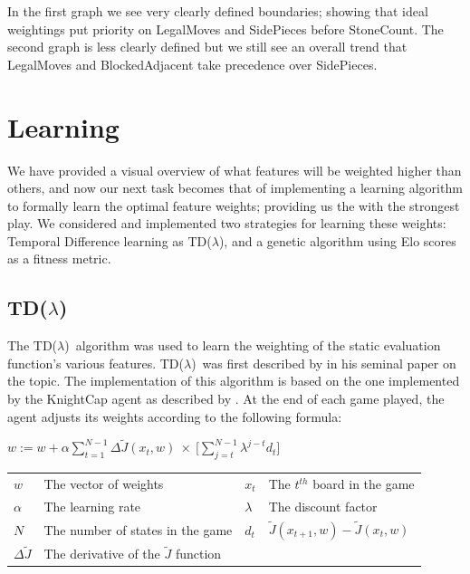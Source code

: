\documentclass[11pt]{article}
\newcommand{\tdl}{TD($\lambda$)}
\begin{document}
In the first graph we see very clearly defined boundaries; showing that ideal weightings
put priority on LegalMoves and SidePieces before StoneCount. The second graph is less
clearly defined but we still see an overall trend that LegalMoves and BlockedAdjacent
take precedence over SidePieces.

\section{Learning}
\label{sec:learning}

We have provided a visual overview of what features will be weighted higher
than others, and now our next task becomes that of implementing a learning algorithm
to formally learn the optimal feature weights; providing us the with
the strongest play. We considered and implemented two strategies for learning
these weights: Temporal Difference learning as \tdl, and a genetic algorithm
using Elo scores as a fitness metric.

\subsection{\tdl}
\label{sub:tdlambda}

The \tdl\ algorithm was used to learn the weighting of the static evaluation
function's various features. \tdl\ was first described by \citet{Sutton1988}
in his seminal paper on the topic. The implementation of this algorithm is
based on the one implemented by the KnightCap agent as described by
\citet{Baxter1997}.  At the end of each game played, the agent adjusts its
weights according to the following formula:

\begin{center}

    $\displaystyle w := w + \alpha \sum _{t=1} ^{N-1} \Delta \tilde{J}(x_t,w) \: \times \: \Big[ \sum ^ {N-1} _{j=t} \lambda^{j-t} d_t \Big] $\\
        
    \begin{tabular}{  l l | l l }
      $w$                   & The vector of weights                         &$x_t$  & The $t^{th}$ board in the game \\
      $\alpha$              & The learning rate                             &$\lambda$      &The discount factor \\
      $N$                   & The number of states in the game              &$d_t$          &$\tilde{J}(x_{t+1},w) - \tilde{J}(x_t,w)$\\
      $\Delta \tilde{J}$    & The derivative of the $\tilde{J}$ function    &               &\\
    \end{tabular}
\end{center}
\end{document}
